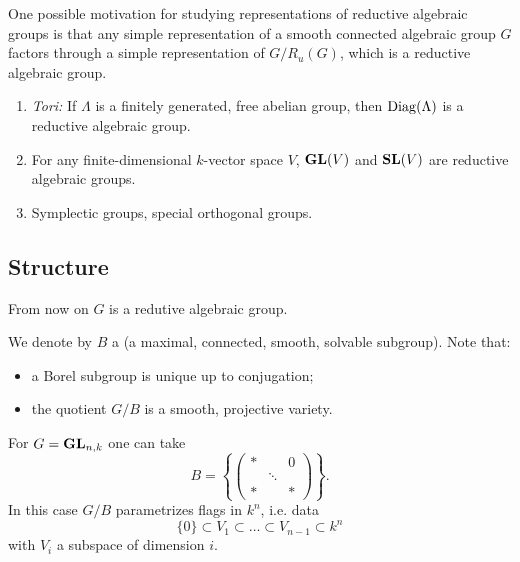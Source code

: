 One possible motivation for studying representations of reductive algebraic groups is that any simple representation of a smooth connected algebraic group $G$ factors through a simple representation of $G /R_u(G)$, which is a reductive algebraic group.

\begin{example} \leavevmode
	\begin{enumerate}[(1)]
		\item \emph{Tori:} If $\Lambda$ is a finitely generated, free abelian group, then $\operatorname{Diag}(\Lambda)$ is a reductive algebraic group.
		\item For any finite-dimensional $k$-vector space $V$, $\mathbf{GL}(V)$ and $\mathbf{SL}(V)$ are reductive algebraic groups.
		\item Symplectic groups, special orthogonal groups.
	\end{enumerate}
\end{example}
\subsection{Structure} From now on $G$ is a redutive algebraic group.

We denote by $B$ a  (a maximal, connected, smooth, solvable subgroup). Note that:
\begin{itemize}
	\item a Borel subgroup is unique up to conjugation;
	\item the quotient $G /B$ is a smooth, projective variety.
\end{itemize}
\begin{example}
	 For $G=\mathbf{GL}_{n,k}$ one can take
	 \[
		 B = \left\{ \begin{pmatrix} * & & 0 \\ & \ddots & \\ * & & *\end{pmatrix}  \right\} .
	 \] 
	 In this case $G /B$ parametrizes flags in $k^{n}$, i.e. data
	 \[
	  \{0\} \subset V_1\subset \dots\subset V_{n-1}\subset k^{n}
	 \]
	 with $V_i$ a subspace of dimension $i$.
\end{example}



